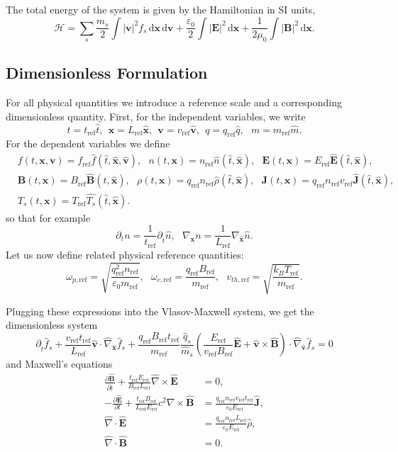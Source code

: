 \documentclass[english]{article}
\newcommand{\bx}{\textbf{x}}
\newcommand{\bv}{\textbf{v}}
\newcommand{\bB}{\textbf{B}}
\newcommand{\bE}{\textbf{E}}
\newcommand{\bJ}{\textbf{J}}
\newcommand{\du}{\,\mathrm{d}}
\newcommand{\tr}{t_{\mathrm{ref}}}
\newcommand{\xr}{L_{\mathrm{ref}}}
\newcommand{\nr}{n_{\mathrm{ref}}}
\newcommand{\fr}{f_{\mathrm{ref}}}
\newcommand{\qr}{q_{\mathrm{ref}}}
\newcommand{\Tr}{T_{\mathrm{ref}}}
\newcommand{\mr}{m_{\mathrm{ref}}}
\newcommand{\Br}{B_{\mathrm{ref}}}
\newcommand{\Er}{E_{\mathrm{ref}}}
\newcommand{\vr}{v_{\mathrm{ref}}}
\newcommand{\vthr}{v_{th,\mathrm{ref}}}
\newcommand{\ompr}{\omega_{p,\mathrm{ref}}}
\newcommand{\omcr}{\omega_{c,\mathrm{ref}}}
\newcommand{\nablaht}{\hat{\nabla}}
\newcommand{\nablaxht}{\hat{\nabla}_{\xht}}
\newcommand{\nablavht}{\hat{\nabla}_{\vht}}
\newcommand{\tht}{\hat{t}}
\newcommand{\xht}{\hat{\bx}}
\newcommand{\vht}{\hat{\bv}}
\newcommand{\qht}{\hat{q}}
\newcommand{\mht}{\hat{m}}
\newcommand{\Eht}{\hat{\bE}}
\newcommand{\Bht}{\hat{\bB}}
\newcommand{\Jht}{\hat{\bJ}}
\newcommand{\rhoht}{\hat{\rho}}
\newcommand{\nht}{\hat{n}}
\newcommand{\Tsht}{\hat{T_{s}}}
\newcommand{\fht}{\hat{f}}
\begin{document}
The total energy of the system is given by the Hamiltonian in SI units,
\begin{equation}\label{eq:hamiltonian}
	\mathcal{H}=\sum_s\frac{m_s}{2}\int |\bv|^2 f_s \du\bx \du\bv + \frac{\varepsilon_0}{2} \int |\bE|^2 \du\bx + \frac{1}{2\mu_0} \int |\bB|^2 \du\bx.
\end{equation}



\subsection{Dimensionless Formulation}

For all physical quantities we introduce a reference scale and a corresponding dimensionless quantity.
First, for the independent variables, we write
$$t= \tr \tht, ~~ \bx= \xr \xht, ~~ \bv = \vr \vht, ~~ q = \qr\qht, ~~~ m = \mr\mht.$$
For the dependent variables we define
\begin{align*}
	 & f(t,\bx,\bv) = \fr \fht(\tht, \xht, \vht),~~~
	n(t,\bx) = \nr \nht(\tht, \xht), ~~~
	\bE(t,\bx) = \Er \Eht(\tht, \xht),               \\
	 & \bB(t,\bx) = \Br \Bht(\tht, \xht), ~~~
	\rho(t,\bx) = \qr\nr \rhoht(\tht, \xht), ~~~
	\bJ(t,\bx) = \qr\nr\vr \Jht(\tht, \xht),         \\
	 & T_s(t,\bx) = \Tr\Tsht(\tht, \xht).
\end{align*}
so that for example
$$\partial_t n = \frac{1}{\tr}\partial_{\tht} \nht, ~~~ \nabla_\bx n =  \frac{1}{\xr}\nabla_\xht \nht.$$
Let us now define related physical reference quantities:
\begin{equation}
	\ompr =\sqrt{\frac{\qr^2\nr}{\varepsilon_0\mr} }, ~~~ \omcr=\frac{\qr\Br}{\mr}, ~~~ \vthr = \sqrt{\frac{k_B \Tr}{\mr}}.
\end{equation}

Plugging these expressions into the Vlasov-Maxwell system, we get the dimensionless system
\begin{equation}\label{eq:Vlasovtr}
	\partial_{\tht} \fht_s + \frac{\vr\tr}{\xr}\vht \cdot \nablaxht \fht_s + \frac{\qr\Br\tr}{\mr} \frac{\qht_s}{\mht_s} \left( \frac{\Er}{\vr\Br}\Eht + \vht \times \Bht \right) \cdot \nablavht \fht_s = 0
\end{equation}
and Maxwell's equations
\begin{subequations}
	\begin{align}
		\frac{\partial \Bht}{\partial \tht} + \frac{\tr \Er}{\Br\xr}\nablaht \times \Eht  & = 0 ,                                         \\
		-  \frac{\partial \Eht}{\partial t} + \frac{\tr\Br}{\xr\Er} c^2\nabla \times \Bht & = \frac{\qr\nr\vr\tr}{\varepsilon_0\Er}\Jht , \\
		\nablaht \cdot \Eht                                                               & = \frac{\qr\nr\xr}{\varepsilon_0\Er}\rhoht,   \\
		\nablaht \cdot \Bht                                                               & = 0.
	\end{align}
\end{subequations}
\end{document}
